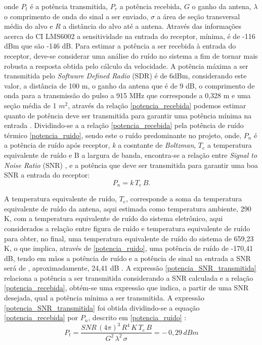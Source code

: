 onde $P_t$ é a potência transmitida, $P_r$ a potência recebida, $G$ o ganho da antena, $\lambda$ o comprimento de onda do sinal a ser enviado, $\sigma$ a área de seção transversal média do alvo e $R$ a distância do alvo até a antena.
Através das informações acerca do CI LMS6002 a sensitividade na entrada do receptor, mínima, é de -116 dBm que são -146 dB. Para estimar a potência a ser recebida à entrada do receptor, deve-se considerar uma análise do ruído no sistema a fim de tornar mais robusta a resposta obtida pelo cálculo da velocidade.
A potência máxima a ser transmitida pelo  \emph{Software Defined Radio} (SDR) é de 6dBm, considerando este valor, a distância de 100 m, o ganho da antena que é de 9 dB, o comprimento de onda para a transmissão do pulso a 915 MHz que corresponde a 0,328 m e uma seção média de 1 $m^2$, através da relação \ref{potencia_recebida} podemos estimar quanto de potência deve ser transmitida para garantir uma potência mínima na entrada \cite{richards}.
Dividindo-se a a relação \ref{potencia_recebida} pela potência de ruído térmico \ref{potencia_ruido}, sendo este o ruído predominante no projeto, onde, $P_n$ é a potência de ruído após receptor, \emph{k} a cosntante de \emph{Boltzman}, $T_e$ a temperatura equivalente de ruído e B a largura de banda, encontra-se a relação entre \emph{Signal to Noise Ratio} (SNR) \cite{vasilescu}, e a potência que deve ser transmitida para garantir uma boa SNR a entrada do receptor:
\begin{equation}\label{potencia_ruido}
    P_n = k\, T_e\,B.
\end{equation}

A temperatura equivalente de ruído, $T_e$, corresponde a soma da temperatura equivalente de ruído da antena, aqui estimada como temperatura ambiente, 290 K, com a temperatura equivalente de ruído do sistema eletrônico, aqui considerados a relação entre figura de ruído e temperatura equivalente de ruído para obter, no final, uma temperatura equivalente de ruído do sistema de 659,23 K, o que implica, através de \ref{potencia_ruido}, uma potência de ruído de -170,41 dB, tendo em mãos a potência de ruído e a potência de sinal na entrada a SNR será de , aproximadamente, 24,41 dB .
A expressão \ref{potencia_SNR_transmitida} relaciona a potência a ser transmitida considerando a SNR calculada e a relação \ref{potencia_recebida}, obtém-se uma expressão que indica, a partir de uma SNR desejada, qual a potência mínima a ser transmitida. A expressão \ref{potencia_SNR_transmitida} foi obtida dividindo-se a equação \ref{potencia_recebida} por $P_n$, descrito em \ref{potencia_ruido}  \cite{richards}:
\begin{equation}\label{potencia_SNR_transmitida}
    P_t = \frac{ SNR\,(4\pi)^{3}\,R^{4}\,K\,T_e\,B}{G^{2}\,   \lambda^{2}\, \sigma }  = -\,0,29\,dBm
\end{equation}
